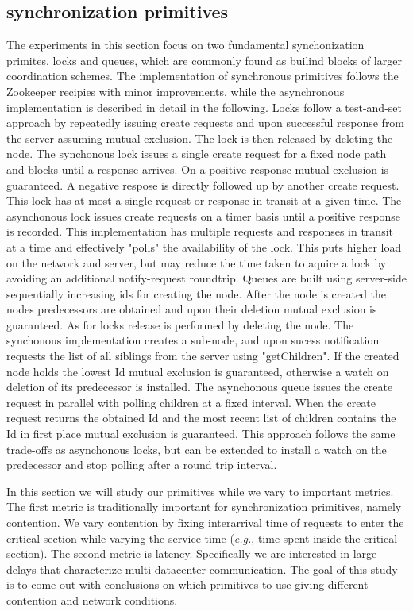 \subsection{synchronization primitives}
The experiments in this section focus on two fundamental synchonization primites, locks and queues, which are commonly found as builind blocks of larger coordination schemes. The implementation of synchronous primitives follows the Zookeeper recipies with minor improvements, while the asynchronous implementation is described in detail in the following.
Locks follow a test-and-set approach by repeatedly issuing create requests and upon successful response from the server assuming mutual exclusion. The lock is then released by deleting the node. The synchonous lock issues a single create request for a fixed node path and blocks until a response arrives. On a positive response mutual exclusion is guaranteed. A negative respose is directly followed up by another create request. This lock has at most a single request or response in transit at a given time. The asynchonous lock issues create requests on a timer basis until a positive response is recorded. This implementation has multiple requests and responses in transit at a time and effectively "polls" the availability of the lock. This puts higher load on the network and server, but may reduce the time taken to aquire a lock by avoiding an additional notify-request roundtrip.
Queues are built using server-side sequentially increasing ids for creating the node. After the node is created the nodes predecessors are obtained and upon their deletion mutual exclusion is guaranteed. As for locks release is performed by deleting the node. The synchonous implementation creates a sub-node, and upon sucess notification requests the list of all siblings from the server using "getChildren". If the created node holds the lowest Id mutual exclusion is guaranteed, otherwise a watch on deletion of its predecessor is installed. The asynchonous queue issues the create request in parallel with polling children at a fixed interval. When the create request returns the obtained Id and the most recent list of children contains the Id in first place mutual exclusion is guaranteed. This approach follows the same trade-offs as asynchonous locks, but can be extended to install a watch on the predecessor and stop polling after a round trip interval.

In this section we will study our primitives while we vary to important metrics. The first metric is traditionally important for synchronization primitives, namely contention. We vary contention by fixing interarrival time of requests to enter the critical section while varying the service time (\emph{e.g.}, time spent inside the critical section). The second metric is latency. Specifically we are interested in large delays that characterize multi-datacenter communication. The goal of this study is to come out with conclusions on which primitives to use giving different contention and network conditions.

